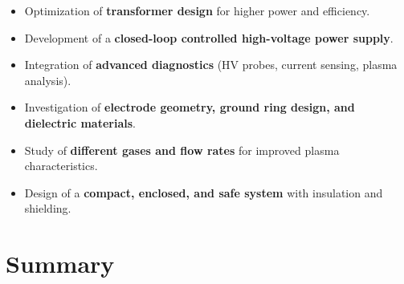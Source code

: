 \begin{itemize}
    \item Optimization of \textbf{transformer design} for higher power and efficiency.
    
    \item Development of a \textbf{closed-loop controlled high-voltage power supply}.
    
    \item Integration of \textbf{advanced diagnostics} (HV probes, current sensing, plasma analysis).
    
    \item Investigation of \textbf{electrode geometry, ground ring design, and dielectric materials}.
    
    \item Study of \textbf{different gases and flow rates} for improved plasma characteristics.
    
    \item Design of a \textbf{compact, enclosed, and safe system} with insulation and shielding.
\end{itemize}

\vspace{0.3cm}

\section{Summary}

\begin{center}
\end{center}
